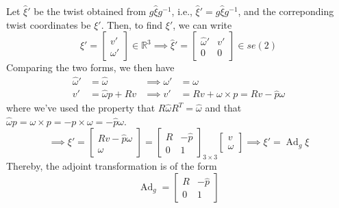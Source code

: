 Let \( \widehat{\xi}' \) be the twist obtained from \( g \widehat{\xi} g^{-1} \), i.e., \( \widehat{\xi}' = g \widehat{\xi} g^{-1} \), and the correponding twist coordinates be \( \xi' \).
Then, to find \( \xi' \), we can write
\begin{equation*}
    \xi'
    =
    \begin{bmatrix}
        v' \\
        \omega'
    \end{bmatrix}
    \in \mathbb{R}^{3}
    \implies
    \widehat{\xi}'
    =
    \begin{bmatrix}
        \widehat{\omega}' & v' \\
        0                 & 0
    \end{bmatrix}
    \in s e(2)
\end{equation*}
Comparing the two forms, we then have
\begin{align*}
    \widehat{\omega}'
     & =
    \widehat{\omega}
     &
    \implies
    \omega'
     & =
    \omega
    \\
    v'
     & =
    \widehat{\omega} p + R v
     &
    \implies
    v'
     & =
    R v + \omega \times p
    =
    R v - \widehat{p} \omega
\end{align*}
where we've used the property that \( R \widehat{\omega} R^T = \widehat{\omega} \) and that \( \widehat{\omega} p = \omega \times p = - p \times \omega = - \widehat{p} \omega \).
\begin{equation*}
    \implies
    \xi'
    =
    \begin{bmatrix}
        R v - \widehat{p} \omega \\
        \omega
    \end{bmatrix}
    =
    \begin{bmatrix}
        R & -\widehat{p} \\
        0 & 1
    \end{bmatrix}_{3 \times 3}
    \begin{bmatrix}
        v \\
        \omega
    \end{bmatrix}
    \implies
    \boxed{
        \xi'
        =
        \operatorname{Ad}_{g} \xi
    }
\end{equation*}
Thereby, the adjoint transformation is of the form
\begin{equation*}
    \operatorname{Ad}_{g}
    =
    \begin{bmatrix}
        R & -\widehat{p} \\
        0 & 1
    \end{bmatrix}
\end{equation*}
